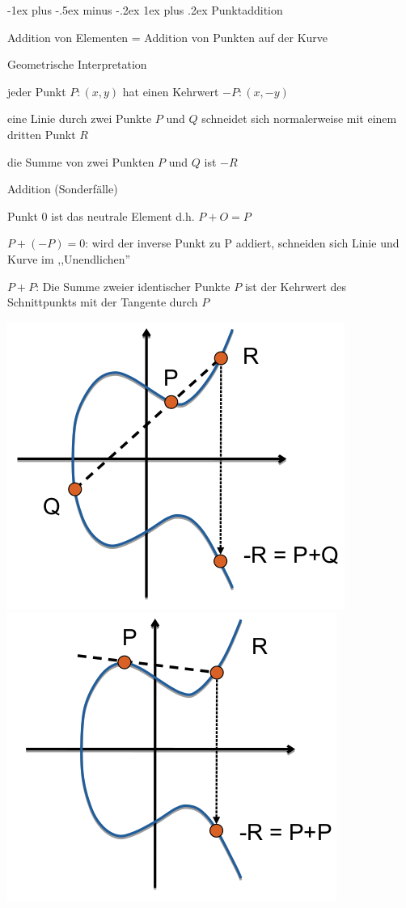 \documentclass[a4paper]{article}
\makeatletter
\renewcommand{\subsubsection}{\@startsection{subsubsection}{3}{0mm}%
 {-1ex plus -.5ex minus -.2ex}%
 {1ex plus .2ex}%
 {\normalfont\small\bfseries}}
\makeatother
\begin{document}
\begin{multicols}{3}
      \subsubsection{Punktaddition}
      \begin{itemize*}
            \item Addition von Elementen = Addition von Punkten auf der Kurve
            \item Geometrische Interpretation
            \begin{itemize*}
                  \item jeder Punkt $P:(x,y)$ hat einen Kehrwert $-P:(x,-y)$
                  \item eine Linie durch zwei Punkte $P$ und $Q$ schneidet sich normalerweise mit einem dritten Punkt $R$
                  \item die Summe von zwei Punkten $P$ und $Q$ ist $-R$
            \end{itemize*}
            \item Addition (Sonderfälle)
            \begin{itemize*}
                  \item Punkt $0$ ist das neutrale Element d.h. $P+O=P$
                  \item $P + (-P)=0$: wird der inverse Punkt zu P addiert, schneiden sich Linie und Kurve im ,,Unendlichen''
                  \item $P+P$: Die Summe zweier identischer Punkte $P$ ist der Kehrwert des Schnittpunkts mit der Tangente durch $P$
            \end{itemize*}
      \end{itemize*}
      \begin{center}
            \includegraphics[width=.45\linewidth]{Assets/NetworkSecurity-ecc-3.png}
            \includegraphics[width=.45\linewidth]{Assets/NetworkSecurity-ecc-4.png}
      \end{center}


\end{multicols}
\end{document}
